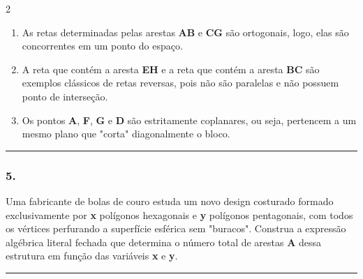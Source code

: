 \documentclass[twoside, 10pt, a4paper]{article}
\newlength{\espacoPreQuestao}\setlength{\espacoPreQuestao}{0.1cm}
\newlength{\espacoQuestao}\setlength{\espacoQuestao}{0.2cm}
\newlength{\espacoAlt}\setlength{\espacoAlt}{0.2cm}
\begin{document}
\begin{multicols*}{2}
\begin{enumerate}[label=\alph*), itemsep=\espacoAlt]
\item As retas determinadas pelas arestas \textbf{AB} e \textbf{CG} são ortogonais, logo, elas são concorrentes em um ponto do espaço.
\item A reta que contém a aresta \textbf{EH} e a reta que contém a aresta \textbf{BC} são exemplos clássicos de retas reversas, pois não são paralelas e não possuem ponto de interseção.
\item Os pontos \textbf{A}, \textbf{F}, \textbf{G} e \textbf{D} são estritamente coplanares, ou seja, pertencem a um mesmo plano que "corta" diagonalmente o bloco.
\end{enumerate}
\par\vspace{\espacoQuestao}

\noindent\textcolor{CorLinha}{\rule{\linewidth}{0.5pt}} 
\par\vspace{\espacoPreQuestao}
\subsubsection*{5.} Uma fabricante de bolas de couro estuda um novo design costurado formado exclusivamente por \textbf{x} polígonos hexagonais e \textbf{y} polígonos pentagonais, com todos os vértices perfurando a superfície esférica sem "buracos". Construa a expressão algébrica literal fechada que determina o número total de arestas \textbf{A} dessa estrutura em função das variáveis \textbf{x} e \textbf{y}.
\par\vspace{\espacoQuestao}

\noindent\textcolor{CorLinha}{\rule{\linewidth}{0.5pt}} 
\par\vspace{\espacoPreQuestao}

\end{multicols*}
\end{document}
